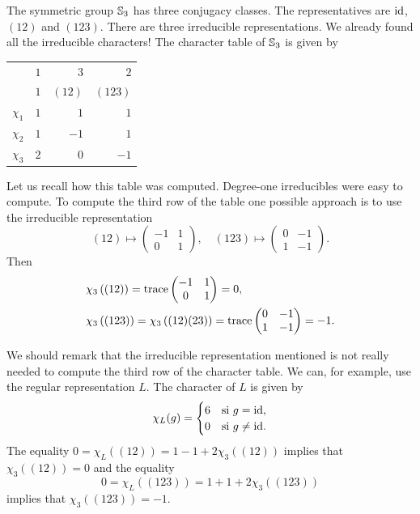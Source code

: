 \begin{example}
	The symmetric group $\mathbb{S}_3$ has three conjugacy classes. The representatives are 
	$\operatorname{id}$, $(12)$ and $(123)$. There are three irreducible representations. We already found all the irreducible characters! 
	The character table of $\mathbb{S}_3$ is given by 
	\begin{center}
		\begin{tabular}{|c|rrr|}
			\hline
			& $1$ & $3$ & $2$\tabularnewline
			& $1$ & $(12)$ & $(123)$ \tabularnewline
			\hline 
			$\chi_{1}$ & $1$ & $1$ & $1$\tabularnewline
			$\chi_{2}$ & $1$ & $-1$ & $1$ \tabularnewline
			$\chi_{3}$ & $2$ & $0$ & $-1$ \tabularnewline
			\hline
		\end{tabular}
	\end{center}
	Let us recall how this table was computed. Degree-one irreducibles were easy to compute. 
	To compute the third row of the table one possible approach is to use
	the irreducible representation  
	\[
	(12)\mapsto \begin{pmatrix}-1&1\\0&1\end{pmatrix},
	\quad
	(123)\mapsto \begin{pmatrix}0&-1\\1&-1\end{pmatrix}.
	\]
    Then	
    \begin{align*}
		&\chi_3\left( (12) \right)=\operatorname{trace}\begin{pmatrix}-1&1\\0&1\end{pmatrix}=0,\\
		&\chi_3\left( (123) \right)=\chi_3\left( (12)(23)\right)=\operatorname{trace}\begin{pmatrix}0&-1\\1&-1\end{pmatrix}=-1.
	\end{align*}

	We should remark that the irreducible representation mentioned is not really needed to
	compute the third row of the character table. We can, for example, use the regular
	representation $L$. The character of $L$ is given by 
	\[
		\chi_L(g)=\begin{cases}
			6 & \text{si $g=\operatorname{id}$},\\
			0 & \text{si $g\ne\operatorname{id}$}.
		\end{cases}
	\]
	The equality $0=\chi_L\left( (12) \right)=1-1+2\chi_3( (12))$ implies that 
	$\chi_3( (12))=0$ and the equality 
    \[ 
    0=\chi_L( (123))=1+1+2\chi_3( (123))
    \]
	implies that $\chi_3\left( (123) \right)=-1$. 


\end{example}

